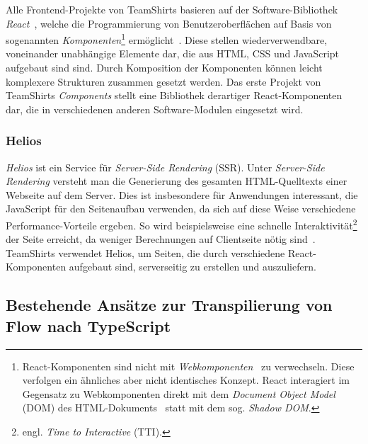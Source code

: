 Alle Frontend-Projekte von TeamShirts basieren auf der Software-Bibliothek \textit{React}~\autocite{SOFTWARE:REACT}, welche die Programmierung von Benutzeroberflächen auf Basis von sogenannten \emph{Komponenten}\footnote{React-Komponenten sind nicht mit \textit{Webkomponenten}~\autocite{MDN:WEBCOMPONENTS} zu verwechseln. Diese verfolgen ein ähnliches aber nicht identisches Konzept. React interagiert im Gegensatz zu Webkomponenten direkt mit dem \textit{Document Object Model} (DOM) des HTML-Dokuments~\autocite{REACT:WEBCOMPONENTS} statt mit dem sog. \textit{Shadow DOM}.} ermöglicht~\autocite{ACM:REACT}. Diese stellen wiederverwendbare, voneinander unabhängige Elemente dar, die aus HTML, CSS und JavaScript aufgebaut sind sind. Durch Komposition der Komponenten können leicht komplexere Strukturen zusammen gesetzt werden. Das erste Projekt von TeamShirts \textit{Components} stellt eine Bibliothek derartiger React-Komponenten dar, die in verschiedenen anderen Software-Modulen eingesetzt wird.

\subsubsection{Helios}

\textit{Helios} ist ein Service für \emph{Server-Side Rendering} (SSR). Unter \emph{Server-Side Rendering} versteht man die Generierung des gesamten HTML-Quelltexts einer Webseite auf dem Server. Dies ist insbesondere für Anwendungen interessant, die JavaScript für den Seitenaufbau verwenden, da sich auf diese Weise verschiedene Performance-Vorteile ergeben. So wird beispielsweise eine schnelle Interaktivität\footnote{engl. \emph{Time to Interactive} (TTI).} der Seite erreicht, da weniger Berechnungen auf Clientseite nötig sind~\autocite{GOOGLE:RENDERING_ON_THE_WEB}. TeamShirts verwendet Helios, um Seiten, die durch verschiedene React-Komponenten aufgebaut sind, serverseitig zu erstellen und auszuliefern.

\subsection{Bestehende Ansätze zur Transpilierung von Flow nach TypeScript}

